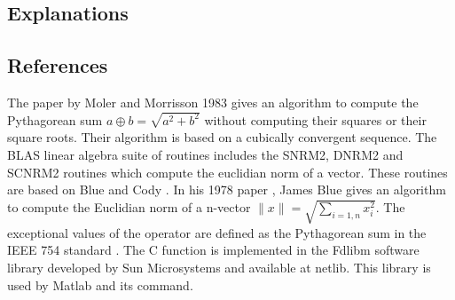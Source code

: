 \subsection{Explanations}

\subsection{References}

The paper by Moler and Morrisson 1983 \cite{journals/ibmrd/MolerM83} gives an 
algorithm to compute the Pythagorean sum $a\oplus b = \sqrt{a^2 + b^2}$
without computing their squares or their square roots. Their algorithm is based on a cubically
convergent sequence.
The BLAS linear algebra suite of routines \cite{900236} includes the SNRM2, DNRM2
and SCNRM2 routines which compute the euclidian norm of a vector.
These routines are based on Blue \cite{355771} and Cody \cite{Cody:1971:SEF}.
In his 1978 paper \cite{355771}, James Blue gives an algorithm to compute the 
Euclidian norm of a n-vector $\|x\| = \sqrt{\sum_{i=1,n}x_i^2}$. 
The exceptional values of the  operator are defined as the 
Pythagorean sum in the IEEE 754 standard \cite{P754:2008:ISF,ieee754-1985}.
The  C function is implemented in the 
Fdlibm software library \cite{fdlibm} developed by Sun Microsystems and 
available at netlib. This library is used by Matlab \cite{matlab-hypot}
and its  command.




